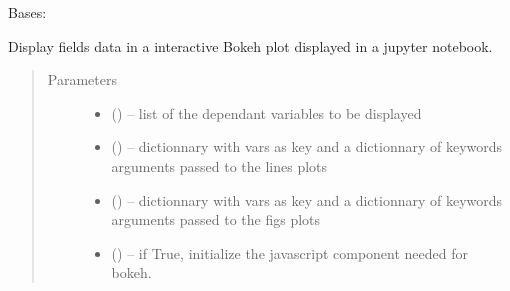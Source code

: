 \documentclass[letterpaper,10pt,english]{sphinxmanual}
\begin{document}
\begin{fulllineitems}
\label{\detokenize{triflow.plugins:triflow.plugins.displays.bokeh_fields_update}}
Bases: 

Display fields data in a interactive Bokeh plot displayed in
a jupyter notebook.
\begin{quote}\begin{description}
\item[{Parameters}] \leavevmode\begin{itemize}
\item {} 
 (\sphinxstyleliteralemphasis{, }) -- list of the dependant variables to be displayed

\item {} 
 () -- dictionnary with vars as key and a dictionnary of keywords arguments passed to the lines plots

\item {} 
 () -- dictionnary with vars as key and a dictionnary of keywords arguments passed to the figs plots

\item {} 
 (\sphinxstyleliteralemphasis{, }) -- if True, initialize the javascript component needed for bokeh.

\end{itemize}

\end{description}\end{quote}

\end{fulllineitems}

\end{document}
